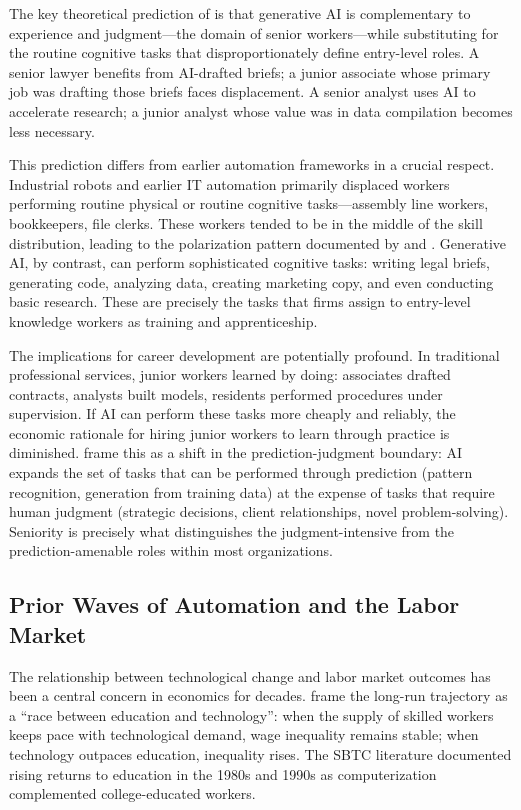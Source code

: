 \documentclass[12pt]{article}
\begin{document}
The key theoretical prediction of \citet{hosseini2025} is that generative AI is complementary to experience and judgment---the domain of senior workers---while substituting for the routine cognitive tasks that disproportionately define entry-level roles. A senior lawyer benefits from AI-drafted briefs; a junior associate whose primary job was drafting those briefs faces displacement. A senior analyst uses AI to accelerate research; a junior analyst whose value was in data compilation becomes less necessary.

This prediction differs from earlier automation frameworks in a crucial respect. Industrial robots \citep{acemoglu2020} and earlier IT automation \citep{autor2003} primarily displaced workers performing routine physical or routine cognitive tasks---assembly line workers, bookkeepers, file clerks. These workers tended to be in the middle of the skill distribution, leading to the polarization pattern documented by \citet{autor2006} and \citet{autor2013}. Generative AI, by contrast, can perform sophisticated cognitive tasks: writing legal briefs, generating code, analyzing data, creating marketing copy, and even conducting basic research. These are precisely the tasks that firms assign to entry-level knowledge workers as training and apprenticeship.

The implications for career development are potentially profound. In traditional professional services, junior workers learned by doing: associates drafted contracts, analysts built models, residents performed procedures under supervision. If AI can perform these tasks more cheaply and reliably, the economic rationale for hiring junior workers to learn through practice is diminished. \citet{agrawal2019} frame this as a shift in the prediction-judgment boundary: AI expands the set of tasks that can be performed through prediction (pattern recognition, generation from training data) at the expense of tasks that require human judgment (strategic decisions, client relationships, novel problem-solving). Seniority is precisely what distinguishes the judgment-intensive from the prediction-amenable roles within most organizations.

\subsection{Prior Waves of Automation and the Labor Market}

The relationship between technological change and labor market outcomes has been a central concern in economics for decades. \citet{goldin2007} frame the long-run trajectory as a ``race between education and technology'': when the supply of skilled workers keeps pace with technological demand, wage inequality remains stable; when technology outpaces education, inequality rises. The SBTC literature \citep{katz1992, card2002} documented rising returns to education in the 1980s and 1990s as computerization complemented college-educated workers.
\end{document}
